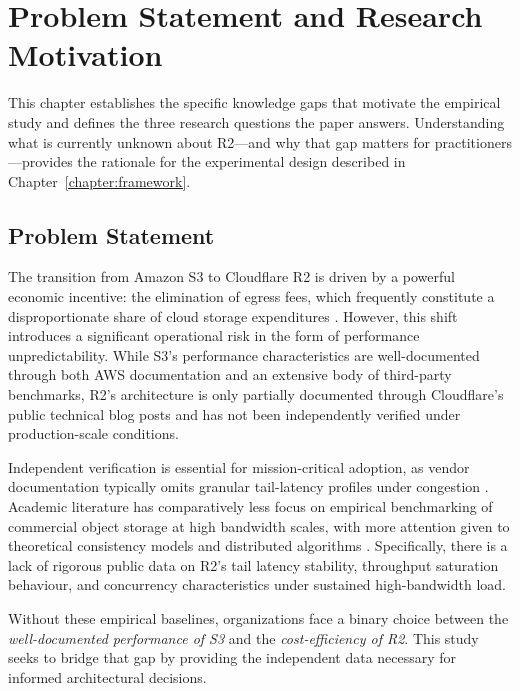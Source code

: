 
\chapter{Problem Statement and Research Motivation}\label{chapter:problem-statement}

This chapter establishes the specific knowledge gaps that motivate the empirical study and defines the three research questions the paper answers. Understanding what is currently unknown about R2---and why that gap matters for practitioners---provides the rationale for the experimental design described in Chapter~\ref{chapter:framework}.

\section{Problem Statement}\label{sec:motivation}

The transition from Amazon S3 to Cloudflare R2 is driven by a powerful economic incentive: the elimination of egress fees, which frequently constitute a disproportionate share of cloud storage expenditures \cite{cerre2024cloud, wasabi2024index}. However, this shift introduces a significant operational risk in the form of performance unpredictability. While S3's performance characteristics are well-documented through both AWS documentation and an extensive body of third-party benchmarks, R2's architecture is only partially documented through Cloudflare's public technical blog posts and has not been independently verified under production-scale conditions.

Independent verification is essential for mission-critical adoption, as vendor documentation typically omits granular tail-latency profiles under congestion \cite{leitner2016benchmarking, varghese2014cloud}. Academic literature has comparatively less focus on empirical benchmarking of commercial object storage at high bandwidth scales, with more attention given to theoretical consistency models and distributed algorithms \cite{zhang2018pileus, muralidhar2014f4, lu2021strong}. Specifically, there is a lack of rigorous public data on R2's tail latency stability, throughput saturation behaviour, and concurrency characteristics under sustained high-bandwidth load.

Without these empirical baselines, organizations face a binary choice between the \textit{well-documented performance of S3} and the \textit{cost-efficiency of R2}. This study seeks to bridge that gap by providing the independent data necessary for informed architectural decisions.

